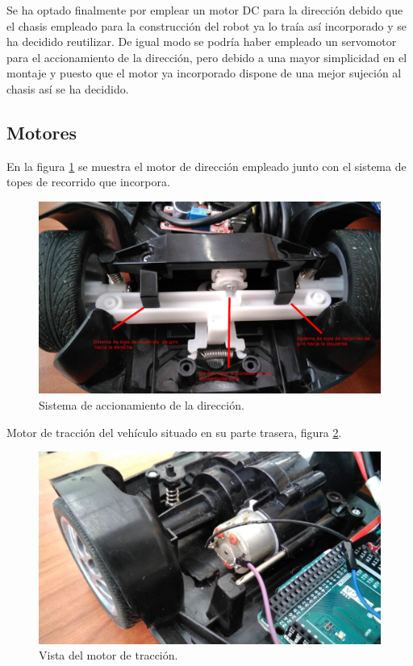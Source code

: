 Se ha optado finalmente por emplear un motor DC para la dirección debido que el chasis empleado para la construcción del robot ya lo traía así incorporado y se ha decidido reutilizar.
De igual modo se podría haber empleado un servomotor para el accionamiento de la dirección, pero debido a una mayor simplicidad en el montaje y puesto que el motor ya incorporado
dispone de una mejor sujeción al chasis así se ha decidido.\\

\subsection{Motores}

En la figura \ref{img:sistema_direccion} se muestra el motor de dirección empleado junto con el sistema de topes de recorrido que incorpora.\\


\begin{figure}[H]
  \begin{center}
    \includegraphics[scale=0.2]{imagenes/robot/motor-direccion.jpg}
  \end{center}
  \caption{Sistema de accionamiento de la dirección.}
  \label{img:sistema_direccion}
\end{figure}

Motor de tracción del vehículo situado en su parte trasera, figura \ref{img:motor_traccion}.

\begin{figure}[H]
  \begin{center}
    \includegraphics[scale=0.2]{imagenes/robot/motor-traccion.jpg}
  \end{center}
  \caption{Vista del motor de tracción.}
  \label{img:motor_traccion}
\end{figure}


